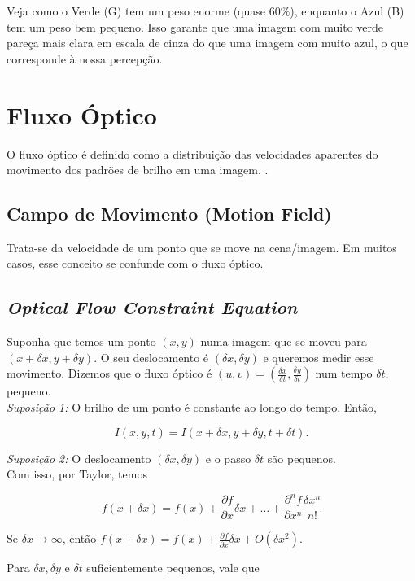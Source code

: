 \documentclass[12pt, a4paper]{article}
\begin{document}
Veja como o Verde (G) tem um peso enorme (quase $60\%$), enquanto o Azul (B) tem um peso bem pequeno. Isso garante que uma imagem com muito verde pareça mais clara em escala de cinza do que uma imagem com muito azul, o que corresponde à nossa percepção.


\section{Fluxo Óptico}

O fluxo óptico é definido como a distribuição das velocidades aparentes do movimento dos padrões de brilho em uma imagem. \cite{Horn1981}. 

\subsection{Campo de Movimento (Motion Field)}

Trata-se da velocidade de um ponto que se move na cena/imagem. Em muitos casos, esse conceito se confunde com o fluxo óptico. 

\subsection{\textit{Optical Flow Constraint Equation}}

Suponha que temos um ponto $(x,y)$ numa imagem que se moveu para $(x+\delta x, y+\delta y)$. O seu  deslocamento é $(\delta x, \delta y)$ e queremos medir esse movimento. Dizemos que o fluxo óptico é $(u, v) = (\frac{\delta x}{\delta t}, \frac{\delta y}{\delta t})$ num tempo $\delta t$, pequeno. \\

\textit{Suposição 1:} O brilho de um ponto é constante ao longo do tempo. Então, 

\[ I(x, y, t) = I(x+ \delta x, y + \delta y, t+\delta t).\]

\textit{Suposição 2:} O deslocamento $(\delta x, \delta y)$ e o passo $\delta t$ são pequenos. \\

Com isso, por Taylor, temos

\[ f(x+\delta x) = f(x) + \frac{\partial f}{\partial x} \delta x + \dots + \frac{\partial^n f}{\partial x^n} \frac{\delta x^n}{n!}\]

Se $\delta x \to \infty$, então $f(x + \delta x) = f(x) + \frac{\partial f}{\partial x} \delta x + O(\delta x^2)$.

Para $\delta x, \delta y$ e $\delta t$ suficientemente pequenos, vale que
\end{document}
